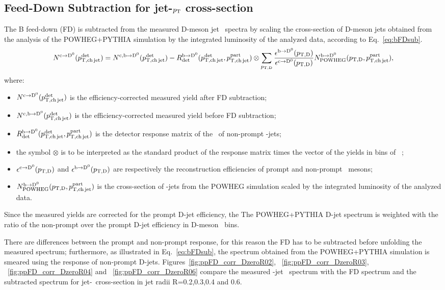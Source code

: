\subsection{Feed-Down Subtraction for jet-$p_{\text T}$ cross-section}
The B feed-down (FD) is subtracted from the measured D-meson jet \pt\ spectra by scaling the cross-section of D-meson jets obtained from the analysis of the POWHEG+PYTHIA simulation by the integrated luminosity of the analyzed data, according to Eq.~\ref{eq:bFDsub}.
\begin{equation}
N^{\rm c\rightarrow\mathrm{D^{0}}}(p_{\mathrm{T,ch\,jet}}^{\mathrm{det}}) = 
N^{\rm c,b\rightarrow\mathrm{D^{0}}}(p_{\mathrm{T,ch\,jet}}^{\mathrm{det}}) - 
R_{\rm det}^{\rm b\rightarrow\mathrm{D^{0}}}(p_{\mathrm{T,ch\,jet}}^{\mathrm{det}},p_{\mathrm{T,ch\,jet}}^{\mathrm{part}}) \otimes \sum_{p_{\mathrm{T,D}}} \frac{\epsilon^{\rm b\rightarrow\mathrm{D^{0}}}(p_{\mathrm{T,D}})}{\epsilon^{\rm c\rightarrow\mathrm{D^{0}}}(p_{\mathrm{T,D}})} N^{\rm b\rightarrow\mathrm{D^{0}}}_{\rm POWHEG}(p_{\mathrm{T,D}},p_{\mathrm{T,ch\,jet}}^{\mathrm{part}}),
\label{eq:bFDsub}
\end{equation}
where:
\begin{itemize}
        \item $N^{\rm c\rightarrow\mathrm{D^{0}}}(p_{\mathrm{T,ch\,jet}}^{\mathrm{det}})$ is the efficiency-corrected measured yield after FD subtraction; 
        \item $N^{\rm c,b\rightarrow\mathrm{D^{0}}}(p_{\mathrm{T,ch\,jet}}^{\mathrm{det}})$ is the efficiency-corrected measured yield before FD subtraction;
        \item $R_{\rm det}^{\rm b\rightarrow\mathrm{D^{0}}}(p_{\mathrm{T,ch\,jet}}^{\mathrm{det}},p_{\mathrm{T,ch\,jet}}^{\mathrm{part}})$ is the detector response matrix of the \pt\ of non-prompt \Dzero-jets;
        \item the symbol $\otimes$ is to be interpreted as the standard product of the response matrix times the vector of the yields in bins of \ptchjetgen\ ;
        \item $\epsilon^{\rm c\rightarrow\mathrm{D^{0}}}(p_{\mathrm{T,D}})$ and $\epsilon^{\rm b\rightarrow\mathrm{D^{0}}}(p_{\mathrm{T,D}})$ are respectively the reconstruction efficiencies of prompt and non-prompt \Dzero\ mesons;
        \item $N^{\rm b\rightarrow\mathrm{D^{0}}}_{\rm POWHEG}(p_{\mathrm{T,D}},p_{\mathrm{T,ch\,jet}}^{\mathrm{part}})$ is the cross-section of \Dzero-jets from the POWHEG simulation scaled by the integrated luminosity of the analyzed data.
\end{itemize}
Since the measured yields are corrected for the prompt D-jet efficiency, the The POWHEG+PYTHIA D-jet spectrum is weighted with the ratio of the non-prompt over the prompt D-jet efficiency in D-meson \pt\ bins.

There are differences between the prompt and non-prompt response, for this reason the FD has to be subtracted before unfolding the measured spectrum; furthermore, as illustrated in Eq.~\ref{eq:bFDsub}, the spectrum obtained from the POWHEG+PYTHIA simulation is smeared using the response of non-prompt D-jets. 
Figures~\ref{fig:ppFD_corr_DzeroR02}, ~\ref{fig:ppFD_corr_DzeroR03}, ~\ref{fig:ppFD_corr_DzeroR04} and ~\ref{fig:ppFD_corr_DzeroR06} compare the measured \Dzero-jet \pt\ spectrum with the FD spectrum and the subtracted spectrum for jet-\pt\ cross-section in jet radii R=0.2,0.3,0.4 and 0.6.


